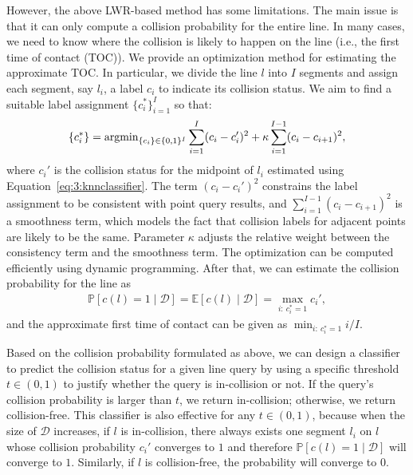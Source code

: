However, the above LWR-based method has some limitations. The main issue is that it can only compute a collision probability for the entire line. In many cases, we need to know where the collision is likely to happen on the line (i.e., the first time of contact (TOC)). We provide an optimization method for estimating the approximate TOC. In particular, we divide the line $l$ into $I$ segments and assign each segment, say $l_i$, a label $c_i$ to indicate its collision status. We aim to find a suitable label assignment $\{c_i^*\}_{i=1}^I$ so that:
\begin{equation}
  \{c_i^*\} = \operatorname{argmin}_{\{c_i\} \in \{0,1\}^I} \sum_{i=1}^I (c_i - c_i')^2 + \kappa \sum_{i=1}^{I-1}(c_i - c_{i+1})^2,
\end{equation}
where $c_i'$ is the collision status for the midpoint of $l_i$ estimated using Equation~\ref{eq:3:knnclassifier}. The term $(c_i - c_i')^2$ constrains the label assignment to be consistent with point query results, and $\sum_{i=1}^{I-1}(c_i - c_{i+1})^2$ is a smoothness term, which models the fact that collision labels for adjacent points are likely to be the same. Parameter $\kappa$ adjusts the relative weight between the consistency term and the smoothness term. The optimization can be computed efficiently using dynamic programming. After that, we can estimate the collision probability for the line as
\begin{align}
  \label{eq:3:linepointprob}
  \mathbb P[c(l) = 1 \mid \mathcal D] = \mathbb E[c(l) \mid \mathcal D] = \max_{i: \ c_i^* = 1} c_i',
\end{align}
and the approximate first time of contact can be given as $\min_{i: \ c_i^* = 1} i / I$.


Based on the collision probability formulated as above, we can design a classifier to predict the collision status for a given line query by using a specific threshold $t \in (0, 1)$ to justify whether the query is in-collision or not. If the query's collision probability is larger than $t$, we return in-collision; otherwise, we return collision-free. This classifier is also effective for any $t \in (0, 1)$, because when the size of $\mathcal D$ increases, if $l$ is in-collision, there always exists one segment $l_i$ on $l$ whose collision probability $c_i'$ converges to $1$ and therefore $\mathbb P[c(l) = 1 \mid \mathcal D]$ will converge to $1$. Similarly, if $l$ is collision-free, the probability will converge to $0$.

